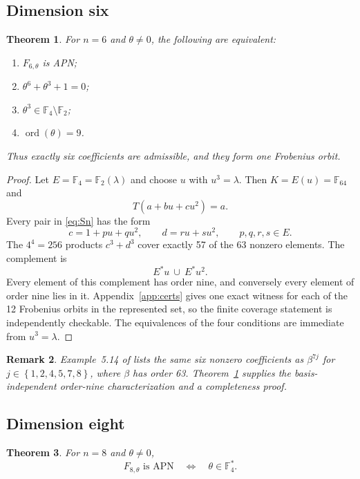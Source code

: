\documentclass[pdflatex,sn-mathphys-num]{sn-jnl}
\theoremstyle{thmstyleone}
\newtheorem{theorem}{Theorem}[section]
\theoremstyle{thmstyletwo}
\newtheorem{remark}[theorem]{Remark}
\theoremstyle{thmstylethree}
\newcommand{\F}{\mathbb F}
\newcommand{\ord}{\operatorname{ord}}
\newcommand{\set}[1]{\left\{#1\right\}}
\begin{document}
\subsection{Dimension six}

\begin{theorem}\label{thm:n6}
For $n=6$ and $\theta\ne0$, the following are equivalent:
\begin{enumerate}
\item $F_{6,\theta}$ is APN;
\item $\theta^6+\theta^3+1=0$;
\item $\theta^3\in\F_4\setminus\F_2$;
\item $\ord(\theta)=9$.
\end{enumerate}
Thus exactly six coefficients are admissible, and they form one Frobenius orbit.
\end{theorem}

\begin{proof}
Let $E=\F_4=\F_2(\lambda)$ and choose $u$ with $u^3=\lambda$.  Then $K=E(u)=\F_{64}$ and
\[
 T(a+bu+cu^2)=a.
\]
Every pair in \eqref{eq:Sn} has the form
\[
 c=1+pu+qu^2,\qquad d=ru+su^2,
 \qquad p,q,r,s\in E.
\]
The $4^4=256$ products $c^3+d^3$ cover exactly 57 of the 63 nonzero elements.  The complement is
\[
 E^*u\ \cup\ E^*u^2.
\]
Every element of this complement has order nine, and conversely every element of order nine lies in it.  Appendix~\ref{app:certs} gives one exact witness for each of the 12 Frobenius orbits in the represented set, so the finite coverage statement is independently checkable.  The equivalences of the four conditions are immediate from $u^3=\lambda$.
\end{proof}

\begin{remark}\label{rem:arshad6}
Example~5.14 of \cite{Arshad2018} lists the same six nonzero coefficients as $\beta^{7j}$ for $j\in\set{1,2,4,5,7,8}$, where $\beta$ has order 63.  Theorem~\ref{thm:n6} supplies the basis-independent order-nine characterization and a completeness proof.
\end{remark}

\subsection{Dimension eight}

\begin{theorem}\label{thm:n8}
For $n=8$ and $\theta\ne0$,
\[
 F_{8,\theta}\text{ is APN}
 \quad\Longleftrightarrow\quad
 \theta\in\F_4^*.
\]
\end{theorem}
\end{document}
